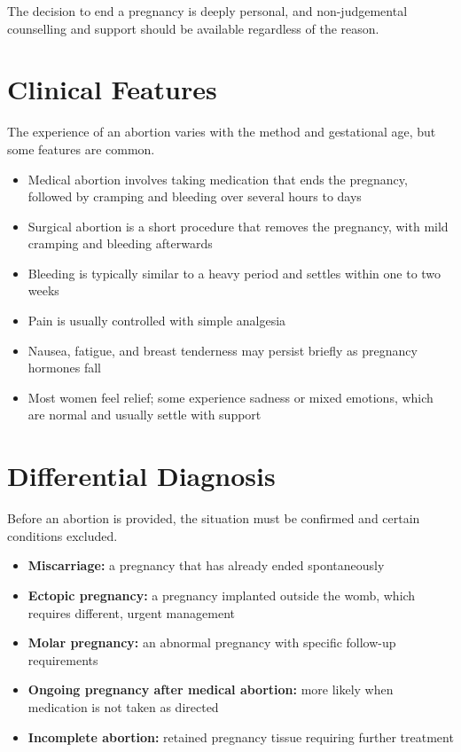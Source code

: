 The decision to end a pregnancy is deeply personal, and non-judgemental counselling and support should be available regardless of the reason.

\section*{Clinical Features}
The experience of an abortion varies with the method and gestational age, but some features are common.

\begin{itemize}
    \item Medical abortion involves taking medication that ends the pregnancy, followed by cramping and bleeding over several hours to days
    \item Surgical abortion is a short procedure that removes the pregnancy, with mild cramping and bleeding afterwards
    \item Bleeding is typically similar to a heavy period and settles within one to two weeks
    \item Pain is usually controlled with simple analgesia
    \item Nausea, fatigue, and breast tenderness may persist briefly as pregnancy hormones fall
    \item Most women feel relief; some experience sadness or mixed emotions, which are normal and usually settle with support
\end{itemize}

\section*{Differential Diagnosis}
Before an abortion is provided, the situation must be confirmed and certain conditions excluded.

\begin{itemize}
    \item \textbf{Miscarriage:} a pregnancy that has already ended spontaneously
    \item \textbf{Ectopic pregnancy:} a pregnancy implanted outside the womb, which requires different, urgent management
    \item \textbf{Molar pregnancy:} an abnormal pregnancy with specific follow-up requirements
    \item \textbf{Ongoing pregnancy after medical abortion:} more likely when medication is not taken as directed
    \item \textbf{Incomplete abortion:} retained pregnancy tissue requiring further treatment
\end{itemize}

